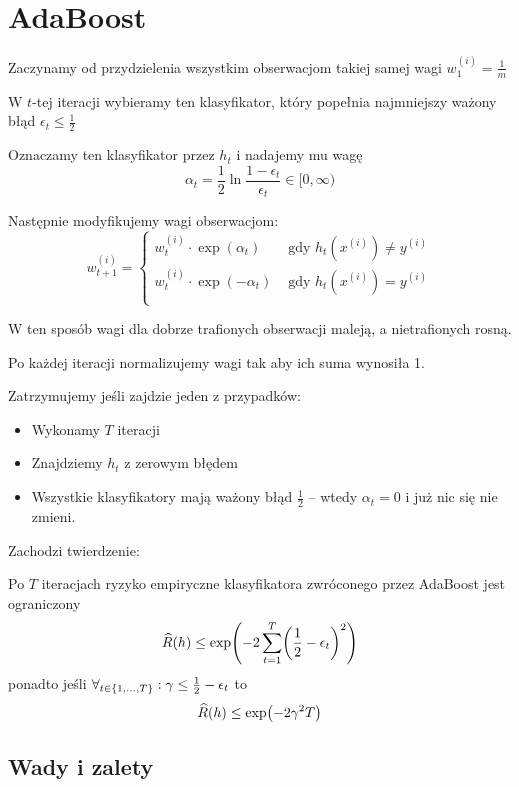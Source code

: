 \section{AdaBoost}

Zaczynamy od przydzielenia wszystkim obserwacjom takiej samej wagi \( w^{(i)}_1 = \frac{1}{m} \)

W \(t\)-tej iteracji wybieramy ten klasyfikator, który popełnia najmniejszy ważony błąd \( \epsilon_t \leq \frac{1}{2} \)

Oznaczamy ten klasyfikator przez \( h_t \) i nadajemy mu wagę
\[
    \alpha_t = \frac{1}{2} \ln \frac{1 - \epsilon_t}{\epsilon_t} \in [0, \infty)
\]

Następnie modyfikujemy wagi obserwacjom:
\[
    w^{(i)}_{t + 1} = \begin{cases}
        w^{(i)}_t \cdot \exp(\alpha_t) & \text{ gdy } h_t(x^{(i)}) \neq y^{(i)} \\
        w^{(i)}_t \cdot \exp(-\alpha_t) & \text{ gdy } h_t(x^{(i)}) = y^{(i)} \\
    \end{cases}
\]

W ten sposób wagi dla dobrze trafionych obserwacji maleją, a nietrafionych rosną.

Po każdej iteracji normalizujemy wagi tak aby ich suma wynosiła 1.

Zatrzymujemy jeśli zajdzie jeden z przypadków:
\begin{itemize}
    \item Wykonamy \( T \) iteracji
    \item Znajdziemy \( h_t \) z zerowym błędem
    \item Wszystkie klasyfikatory mają ważony błąd \( \frac{1}{2} \) -- wtedy \( \alpha_t = 0 \) i już nic się nie zmieni.
\end{itemize}

Zachodzi twierdzenie:
\begin{theorem}
Po \( T \) iteracjach ryzyko empiryczne klasyfikatora zwróconego przez AdaBoost jest ograniczony
\[
    \widehat R(h) \leq \exp\pars{-2\sum_{t=1}^T \pars{\frac{1}{2} - \epsilon_t}^2}
\]
ponadto jeśli \( \forall_{t \in \set{1, \dots, T}} : \gamma \leq \frac{1}{2} - \epsilon_t \)
to
\[
    \widehat R(h) \leq \exp\pars{-2\gamma^2T}
\]
\end{theorem}

\subsection{Wady i zalety}

